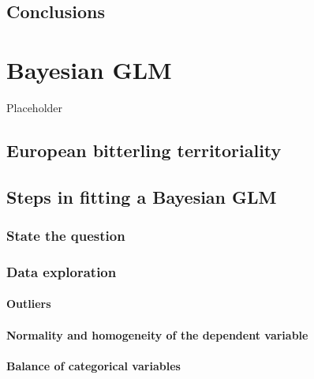 \documentclass[
]{book}
\begin{document}
\hypertarget{conclusions}{%
\section{Conclusions}\label{conclusions}}

\hypertarget{gen-model}{%
\chapter{Bayesian GLM}\label{gen-model}}

Placeholder

\hypertarget{bitterling}{%
\section{European bitterling territoriality}\label{bitterling}}

\hypertarget{glm-steps}{%
\section{Steps in fitting a Bayesian GLM}\label{glm-steps}}

\hypertarget{state-the-question}{%
\subsection{State the question}\label{state-the-question}}

\hypertarget{data-exploration-1}{%
\subsection{Data exploration}\label{data-exploration-1}}

\hypertarget{outliers-1}{%
\subsubsection{Outliers}\label{outliers-1}}

\hypertarget{normality-and-homogeneity-of-the-dependent-variable-1}{%
\subsubsection{Normality and homogeneity of the dependent
variable}\label{normality-and-homogeneity-of-the-dependent-variable-1}}

\hypertarget{balance-of-categorical-variables}{%
\subsubsection{Balance of categorical
variables}\label{balance-of-categorical-variables}}
\end{document}
